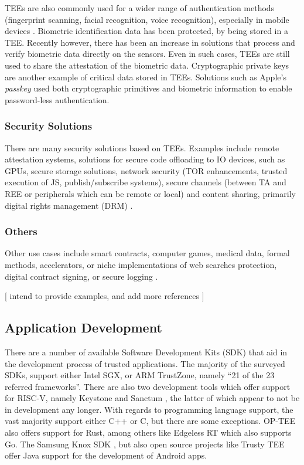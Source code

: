 \documentclass[runningheads,a4paper]{uwsese}
\begin{document}
TEEs are also commonly used for a wider range of authentication methods
(fingerprint scanning, facial recognition, voice recognition), especially in
mobile devices \cite{tee_in_android}. Biometric identification data has been
protected, by being stored in a TEE. Recently however, there has been an
increase in solutions that process and verify biometric data directly on the
sensors. Even in such cases, TEEs are still used to share the attestation of
the biometric data. Cryptographic private keys are another example of critical
data stored in TEEs. Solutions such as Apple's \emph{passkey}
\cite{apple_passkey} used both cryptographic primitives and biometric
information to enable password-less authentication.

\subsubsection{Security Solutions}

There are many security solutions based on TEEs. Examples include remote
attestation systems, solutions for secure code offloading to IO devices, such
as GPUs, secure storage solutions, network security (TOR enhancements, trusted
execution of JS, publish/subscribe systems), secure channels (between TA and
REE or peripherals which can be remote or local) and content sharing, primarily
digital rights management (DRM) \cite{tee_rev_app}.

\subsubsection{Others}

Other use cases include smart contracts, computer games, medical data, formal
methods, accelerators, or niche implementations of web searches protection, 
digital contract signing, or secure logging \cite{tee_rev_app}.

[ intend to provide examples, and add more references ]

\subsection{Application Development}

There are a number of available Software Development Kits (SDK) that aid in the
development process of trusted applications. The majority of the surveyed SDKs,
support either Intel SGX, or ARM TrustZone, namely ``21 of the 23 referred
frameworks''. There are also two development tools which offer support for
RISC-V, namely Keystone \cite{tee_keystone} and Sanctum \cite{tee_sanctum}, the
latter of which appear to not be in development any longer. With regards to
programming language support, the vast majority support either C++ or C, but
there are some exceptions. OP-TEE \cite{optee} also offers support for Rust,
among others like Edgeless RT \cite{edgelessrt} which also supports Go. The
Samsung Knox SDK \cite{knox_sdk}, but also open source projects like Trusty TEE
\cite{trustytee} offer Java support for the development of Android apps.
\end{document}

